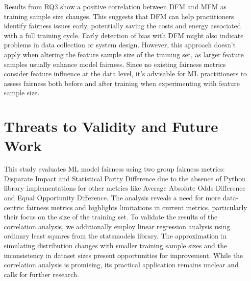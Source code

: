 \documentclass[sigconf,review]{acmart}
\begin{document}
Results from RQ3 show a positive correlation between DFM and MFM as
training sample size changes. This suggests that DFM can help
practitioners identify fairness issues early, potentially saving the
costs and energy associated with a full training cycle. Early
detection of bias with DFM might also indicate problems in data
collection or system design. However, this approach doesn't apply when
altering the feature sample size of the training set, as larger
feature samples usually enhance model fairness. Since no existing
fairness metrics consider feature influence at the data level, it's
advisable for ML practitioners to assess fairness both before and
after training when experimenting with feature sample size.



\section{Threats to Validity and Future Work}\label{sec:threats}

This study evaluates ML model fairness using two group fairness
metrics: Disparate Impact and Statistical Parity Difference due to the
absence of Python library implementations for other metrics like
Average Absolute Odds Difference and Equal Opportunity Difference. The
analysis reveals a need for more data-centric fairness metrics and
highlights limitations in current metrics, particularly their focus on
the size of the training set. To validate the results of the
correlation analysis, we additionally employ linear regression
analysis using ordinary least squares from the statsmodels library.
The approximation in simulating distribution changes with smaller
training sample sizes and the inconsistency in dataset sizes present
opportunities for improvement. While the correlation analysis is
promising, its practical application remains unclear and calls for
further research.
\end{document}
